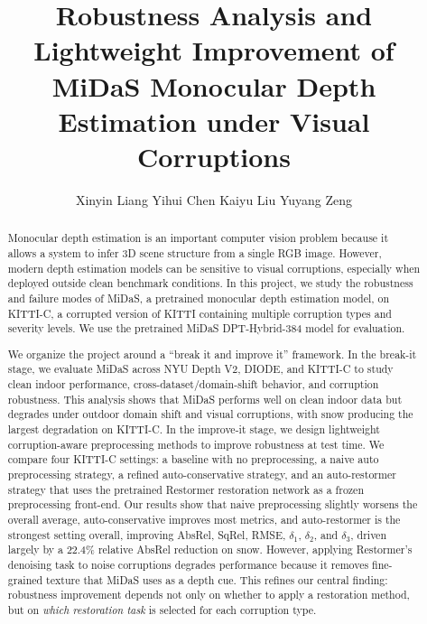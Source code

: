 \documentclass[10pt]{article}
\title{\textbf{Robustness Analysis and Lightweight Improvement of MiDaS Monocular Depth Estimation under Visual Corruptions}}
\author{
Xinyin Liang \quad Yihui Chen \quad Kaiyu Liu \quad Yuyang Zeng
}
\date{}
\begin{document}
\maketitle

\begin{abstract}

Monocular depth estimation is an important computer vision problem because it allows a system to infer 3D scene structure from a single RGB image. However, modern depth estimation models can be sensitive to visual corruptions, especially when deployed outside clean benchmark conditions. In this project, we study the robustness and failure modes of MiDaS, a pretrained monocular depth estimation model, on KITTI-C, a corrupted version of KITTI containing multiple corruption types and severity levels. We use the pretrained MiDaS DPT-Hybrid-384 model for evaluation.

We organize the project around a ``break it and improve it'' framework. In the break-it stage, we evaluate MiDaS across NYU Depth V2, DIODE, and KITTI-C to study clean indoor performance, cross-dataset/domain-shift behavior, and corruption robustness. This analysis shows that MiDaS performs well on clean indoor data but degrades under outdoor domain shift and visual corruptions, with snow producing the largest degradation on KITTI-C. In the improve-it stage, we design lightweight corruption-aware preprocessing methods to improve robustness at test time. We compare four KITTI-C settings: a baseline with no preprocessing, a naive auto preprocessing strategy, a refined auto-conservative strategy, and an auto-restormer strategy that uses the pretrained Restormer restoration network as a frozen preprocessing front-end. Our results show that naive preprocessing slightly worsens the overall average, auto-conservative improves most metrics, and auto-restormer is the strongest setting overall, improving AbsRel, SqRel, RMSE, $\delta_1$, $\delta_2$, and $\delta_3$, driven largely by a 22.4\% relative AbsRel reduction on snow. However, applying Restormer's denoising task to noise corruptions degrades performance because it removes fine-grained texture that MiDaS uses as a depth cue. This refines our central finding: robustness improvement depends not only on whether to apply a restoration method, but on \emph{which restoration task} is selected for each corruption type.

\end{abstract}
\end{document}
